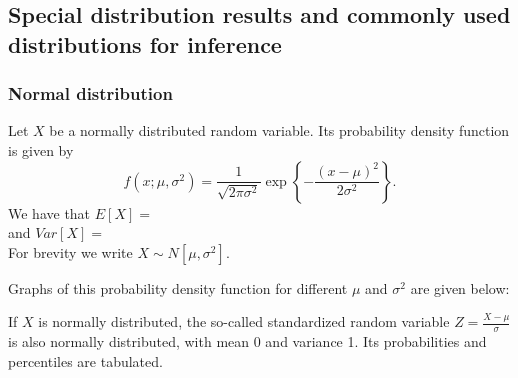 \documentclass[12pt]{article}
\theoremstyle{break}
\begin{document}
\subsection{Special distribution results and commonly used distributions for inference}


\subsubsection{Normal distribution}
Let $X$ be a normally distributed random variable. Its probability density function is given by $$f(x;\mu,\sigma^2) = \frac{1}{\sqrt{2\pi\sigma^2}} \exp \left\{ -\frac{(x-\mu)^2}{2\sigma^2} \right\}.$$
We have that $E[X]=$\\[20pt]
and $Var[X]=$\\[20pt]
For brevity we write $X \sim N[\mu,\sigma^2].$

Graphs of this probability density function for different $\mu$ and $\sigma^2$ are given below:

If $X$ is normally distributed, the so-called standardized random variable $\displaystyle Z=\frac{X-\mu}{\sigma}$ is also normally distributed, with mean 0 and variance 1. Its probabilities and percentiles are tabulated.

\end{document}
